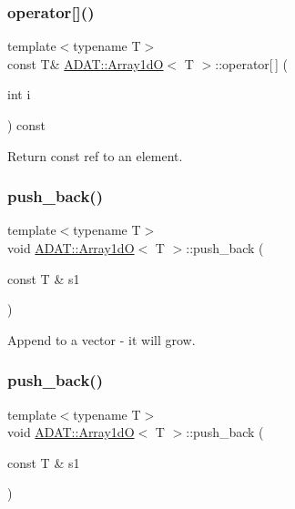 \subsubsection{\texorpdfstring{operator[]()}{operator[]()}\hspace{0.1cm}{\footnotesize\ttfamily [4/4]}}
{\footnotesize\ttfamily template$<$typename T$>$ \\
const T\& \mbox{\hyperlink{classADAT_1_1Array1dO}{A\+D\+A\+T\+::\+Array1dO}}$<$ T $>$\+::operator\mbox{[}$\,$\mbox{]} (\begin{DoxyParamCaption}\item[{int}]{i }\end{DoxyParamCaption}) const\hspace{0.3cm}{\ttfamily [inline]}}



Return const ref to an element. 

\mbox{\label{classADAT_1_1Array1dO_a6e326e7686f842918f3cbda5c6a4b05f}} 
\subsubsection{\texorpdfstring{push\_back()}{push\_back()}\hspace{0.1cm}{\footnotesize\ttfamily [1/2]}}
{\footnotesize\ttfamily template$<$typename T$>$ \\
void \mbox{\hyperlink{classADAT_1_1Array1dO}{A\+D\+A\+T\+::\+Array1dO}}$<$ T $>$\+::push\+\_\+back (\begin{DoxyParamCaption}\item[{const T \&}]{s1 }\end{DoxyParamCaption})\hspace{0.3cm}{\ttfamily [inline]}}



Append to a vector -\/ it will grow. 

\mbox{\label{classADAT_1_1Array1dO_a6e326e7686f842918f3cbda5c6a4b05f}} 
\subsubsection{\texorpdfstring{push\_back()}{push\_back()}\hspace{0.1cm}{\footnotesize\ttfamily [2/2]}}
{\footnotesize\ttfamily template$<$typename T$>$ \\
void \mbox{\hyperlink{classADAT_1_1Array1dO}{A\+D\+A\+T\+::\+Array1dO}}$<$ T $>$\+::push\+\_\+back (\begin{DoxyParamCaption}\item[{const T \&}]{s1 }\end{DoxyParamCaption})\hspace{0.3cm}{\ttfamily [inline]}}



